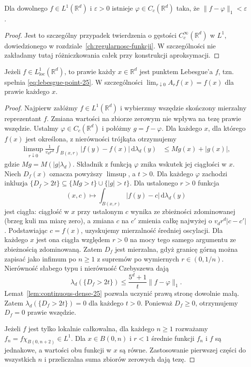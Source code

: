 \begin{lemat}
\label{lem:continuous-dense-25}
Dla dowolnego $f\in L^1(\mathbb R^d)$ i
$\varepsilon>0$ istnieje $\varphi\in C_c(\mathbb R^d)$
taka, że $\|f-\varphi\|_1<\varepsilon$.
\end{lemat}
\begin{proof}
Jest to szczególny przypadek twierdzenia o gęstości
$C_c^\infty(\mathbb R^d)$ w $L^1$, dowiedzionego w
rozdziale~\ref{ch:regularnosc-funkcji}. W szczególności nie
zakładamy tutaj różniczkowania całek przy konstrukcji
aproksymacji.
\end{proof}

\begin{twierdzenie}
\label{thm:lebesgue-diff-25}
Jeżeli $f\in L^1_{\mathrm{loc}}(\mathbb R^d)$, to
prawie każdy $x\in\mathbb R^d$ jest punktem Lebesgue'a
$f$, tzn. spełnia \eqref{eq:lebesgue-point-25}.
W szczególności
$\lim_{r\downarrow0}A_rf(x)=f(x)$ dla prawie każdego $x$.
\end{twierdzenie}
\begin{proof}
Najpierw załóżmy $f\in L^1(\mathbb R^d)$ i wybierzmy
wszędzie skończony mierzalny reprezentant $f$.
Zmiana wartości na zbiorze zerowym nie wpływa na tezę
prawie wszędzie. Ustalmy
$\varphi\in C_c(\mathbb R^d)$ i połóżmy $g=f-\varphi$.
Dla każdego $x$, dla którego $f(x)$ jest określona,
z nierówności trójkąta otrzymujemy
\begin{align*}
 \limsup_{r\downarrow0}\frac1{v_dr^d}
 \int_{B(x,r)}|f(y)-f(x)|\,\mathrm d\lambda_d(y)
 &\le Mg(x)+|g(x)|,
\end{align*}
gdzie $Mg=M(|g|\lambda_d)$. Składnik z funkcją
$\varphi$ znika wskutek jej ciągłości w $x$.
Niech $D_f(x)$ oznacza powyższy $\limsup$, a $t>0$.
Dla każdego $\varphi$ zachodzi inkluzja
$\{D_f>2t\}\subseteq\{Mg>t\}\cup\{|g|>t\}$.
Dla ustalonego $r>0$ funkcja
\[
 (x,c)\longmapsto\int_{B(x,r)}|f(y)-c|\,\mathrm d\lambda_d(y)
\]
jest ciągła: ciągłość w $x$ przy ustalonym $c$ wynika
ze zbieżności zdominowanej (brzeg kuli ma miarę zero),
a zmiana $c$ na $c'$ zmienia całkę najwyżej o
$v_dr^d|c-c'|$. Podstawiając $c=f(x)$, uzyskujemy
mierzalność średniej oscylacji. Dla każdego $x$
jest ona ciągła względem $r>0$ na mocy tego samego
argumentu ze zbieżnością zdominowaną.
Zatem $D_f$ jest mierzalna, gdyż granicę górną można
zapisać jako infimum po $n\ge1$ z supremów po
wymiernych $r\in(0,1/n)$.
Nierówność słabego typu i nierówność Czebyszewa dają
\[
 \lambda_d(\{D_f>2t\})
 \le\frac{5^d+1}{t}\|f-\varphi\|_1.
\]
Lemat~\ref{lem:continuous-dense-25} pozwala uczynić
prawą stronę dowolnie małą. Zatem
$\lambda_d(\{D_f>2t\})=0$ dla każdego $t>0$.
Ponieważ $D_f\ge0$, otrzymujemy $D_f=0$ prawie
wszędzie.

Jeżeli $f$ jest tylko lokalnie całkowalna, dla każdego
$n\ge1$ rozważamy $f_n=f\chi_{B(0,n+2)}\in L^1$.
Dla $x\in B(0,n)$ i $r<1$ średnie funkcji
$f_n$ i $f$ są jednakowe, a wartości obu funkcji
w $x$ są równe. Zastosowanie pierwszej części do
wszystkich $n$ i przeliczalna suma zbiorów zerowych
dają tezę.
\end{proof}

